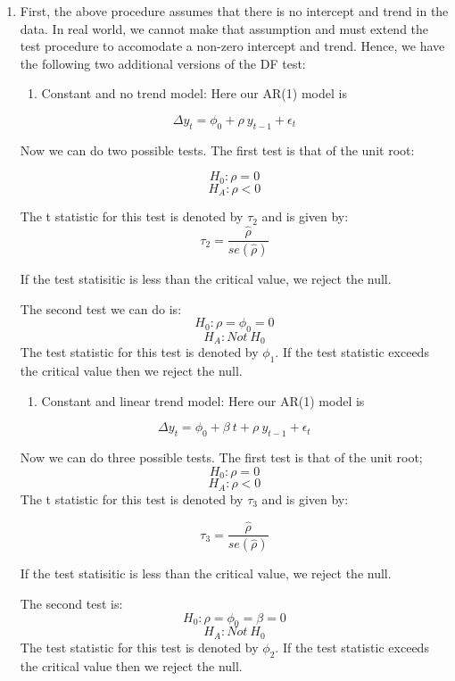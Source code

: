 \documentclass[]{book}
\providecommand{\tightlist}{%
  \setlength{\itemsep}{0pt}\setlength{\parskip}{0pt}}
\theoremstyle{definition}
\theoremstyle{definition}
\theoremstyle{definition}
\theoremstyle{remark}
\begin{document}
\begin{enumerate}
\def\labelenumi{\arabic{enumi}.}
\item
  First, the above procedure assumes that there is no intercept and
  trend in the data. In real world, we cannot make that assumption and
  must extend the test procedure to accomodate a non-zero intercept and
  trend. Hence, we have the following two additional versions of the DF
  test:

  \begin{enumerate}
  \def\labelenumii{\roman{enumii}.}
  \tightlist
  \item
    Constant and no trend model: Here our AR(1) model is
  \end{enumerate}

  \[\Delta y_t= \phi_0 + \rho \ y_{t-1}+\epsilon_t \]

  Now we can do two possible tests. The first test is that of the unit
  root:

  \[H_0: \rho=0 \] \[H_A: \rho<0\]

  The t statistic for this test is denoted by \(\tau_2\) and is given
  by: \[\tau_2 =\frac{\hat{\rho}}{se(\hat{\rho})}\]

  If the test statisitic is less than the critical value, we reject the
  null.

  The second test we can do is: \[H_0: \rho=\phi_0=0 \]
  \[H_A: Not \ H_0\] The test statistic for this test is denoted by
  \(\phi_1\). If the test statistic exceeds the critical value then we
  reject the null.

  \begin{enumerate}
  \def\labelenumii{\roman{enumii}.}
  \setcounter{enumii}{1}
  \tightlist
  \item
    Constant and linear trend model: Here our AR(1) model is
  \end{enumerate}

  \[\Delta y_t= \phi_0 + \beta \ t+ \rho \ y_{t-1}+\epsilon_t \]

  Now we can do three possible tests. The first test is that of the unit
  root; \[H_0: \rho=0 \] \[H_A: \rho<0\] The t statistic for this test
  is denoted by \(\tau_3\) and is given by:

  \[\tau_3 =\frac{\hat{\rho}}{se(\hat{\rho})}\]

  If the test statisitic is less than the critical value, we reject the
  null.

  The second test is: \[H_0: \rho=\phi_0=\beta=0 \] \[H_A: Not \ H_0\]
  The test statistic for this test is denoted by \(\phi_2\). If the test
  statistic exceeds the critical value then we reject the null.


\end{enumerate}
\end{document}
